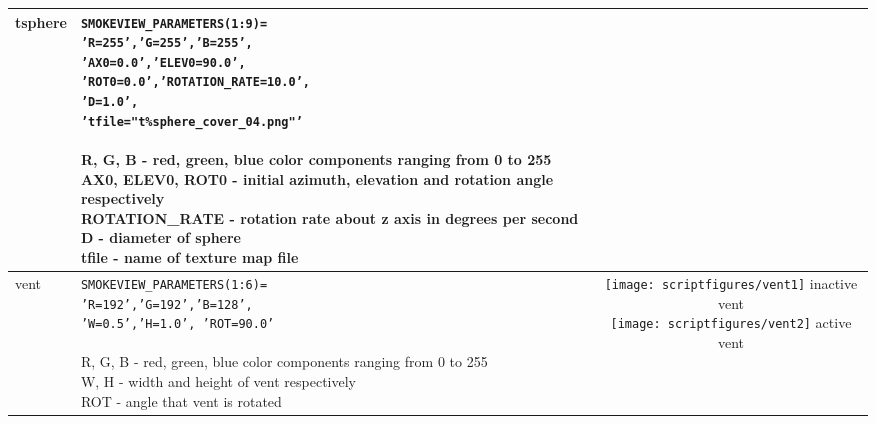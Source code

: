 \begin{longtable}[ht]{|l|l|c|}
tsphere&
\parbox[c]{\boxwidth}{
    {\tt SMOKEVIEW\_PARAMETERS(1:9)=}\\
    {\tt 'R=255','G=255','B=255',}\\
    {\tt 'AX0=0.0','ELEV0=90.0',}\\
    {\tt 'ROT0=0.0','ROTATION\_RATE=10.0',}\\
    {\tt 'D=1.0',}\\
    {\tt 'tfile="t\%sphere\_cover\_04.png"'}\\ \\
R, G, B - red, green, blue color components ranging from 0 to 255\\
AX0, ELEV0, ROT0 - initial azimuth, elevation and rotation angle respectively\\
ROTATION\_RATE - rotation rate about z axis in degrees per second\\
D - diameter of sphere \\
tfile - name of texture map file

} &
 \\ \hline

vent&
\parbox[c]{\boxwidth}{
{\tt SMOKEVIEW\_PARAMETERS(1:6)=}\\
{\tt 'R=192','G=192','B=128',}\\
{\tt 'W=0.5','H=1.0', 'ROT=90.0'}\\ \\
R, G, B - red, green, blue color components ranging from 0 to 255\\
W, H - width and height of vent respectively\\
ROT - angle that vent is rotated
} &
\parbox[c]{\devicewidth}{
\vspace{0.01in}
\texttt{[image: scriptfigures/vent1]}
inactive vent\\
\vspace{0.01in}
\texttt{[image: scriptfigures/vent2]}
active vent\\
\vspace{0.01in}
}
\\ \hline
\end{longtable}

